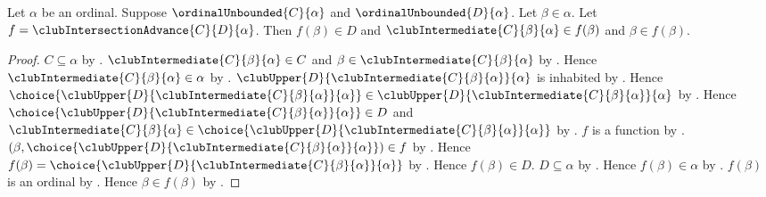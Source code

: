 \begin{proposition}\label{club_intersection_advance_properties}
    Let $\alpha$ be an ordinal.
    Suppose $\ordinalUnbounded{C}{\alpha}$ and
        $\ordinalUnbounded{D}{\alpha}$.
    Let $\beta\in\alpha$.
    Let $f=\clubIntersectionAdvance{C}{D}{\alpha}$.
    Then $f(\beta)\in D$ and
        $\clubIntermediate{C}{\beta}{\alpha}\in f(\beta)$ and
        $\beta\in f(\beta)$.
\end{proposition}
\begin{proof}
    $C\subseteq\alpha$ by .
    $\clubIntermediate{C}{\beta}{\alpha}\in C$ and
        $\beta\in\clubIntermediate{C}{\beta}{\alpha}$
        by .
    Hence $\clubIntermediate{C}{\beta}{\alpha}\in\alpha$
        by .
    $\clubUpper{D}{\clubIntermediate{C}{\beta}{\alpha}}{\alpha}$
        is inhabited by .
    Hence $\choice{\clubUpper{D}{
        \clubIntermediate{C}{\beta}{\alpha}}{\alpha}}
        \in\clubUpper{D}{
            \clubIntermediate{C}{\beta}{\alpha}}{\alpha}$
        by .
    Hence $\choice{\clubUpper{D}{
        \clubIntermediate{C}{\beta}{\alpha}}{\alpha}}\in D$ and
        $\clubIntermediate{C}{\beta}{\alpha}
            \in\choice{\clubUpper{D}{
                \clubIntermediate{C}{\beta}{\alpha}}{\alpha}}$
        by .
    $f$ is a function
        by .
    $(\beta,\choice{\clubUpper{D}{
        \clubIntermediate{C}{\beta}{\alpha}}{\alpha}})\in f$
        by .
    Hence $f(\beta)=\choice{\clubUpper{D}{
        \clubIntermediate{C}{\beta}{\alpha}}{\alpha}}$
        by .
    Hence $f(\beta)\in D$.
    $D\subseteq\alpha$ by .
    Hence $f(\beta)\in\alpha$ by .
    $f(\beta)$ is an ordinal
        by .
    Hence $\beta\in f(\beta)$ by .
\end{proof}

